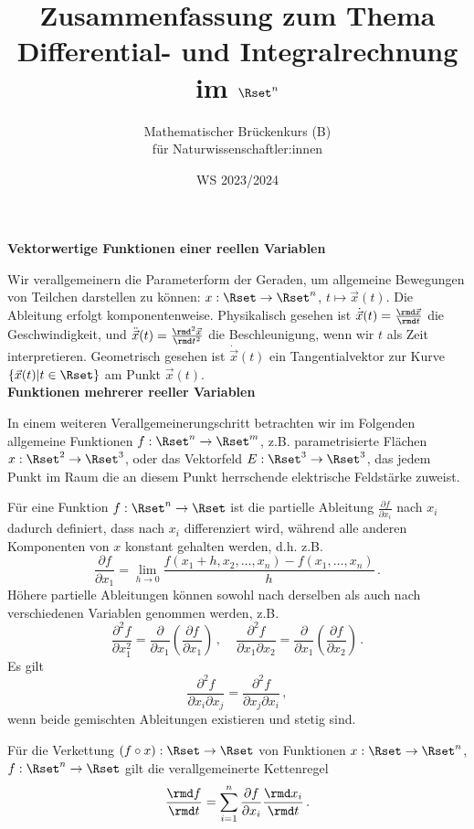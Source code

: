 \documentclass[a4paper,10pt]{article}
\title{Zusammenfassung zum Thema \\ Differential- und Integralrechnung im $\Rset^n$}
\author{Mathematischer Brückenkurs (B)\\für Naturwissenschaftler:innen}
\date{WS 2023/2024}
\begin{document}
\parindent0pt
\maketitle


{\bf Vektorwertige Funktionen einer reellen Variablen}

Wir verallgemeinern die Parameterform der Geraden, um allgemeine
Bewegungen von Teilchen darstellen zu können: $x:\Rset\to\Rset^n$,
$t\mapsto \vec{x}(t)$. Die Ableitung erfolgt komponentenweise.
Physikalisch gesehen ist $\dot{\vec{x}}(t) =\frac{\rmd \vec{x}}{\rmd t}$
die Geschwindigkeit, und $\ddot{\vec{x}}(t) =\frac{\rmd^2 \vec{x}}{\rmd t^2}$
die Beschleunigung, wenn wir $t$ als Zeit interpretieren.
Geometrisch gesehen ist $\dot{\vec{x}}(t)$ ein Tangentialvektor zur
Kurve $\{\vec{x}(t)|t\in\Rset\}$ am Punkt $\vec{x}(t)$.\\


{\bf Funktionen mehrerer reeller Variablen}

In einem weiteren Verallgemeinerungschritt betrachten wir im Folgenden
allgemeine Funktionen $f:\Rset^n\to\Rset^m$, z.B. 
parametrisierte Flächen $x:\Rset^2\to\Rset^3$, oder
das Vektorfeld $E:\Rset^3\to\Rset^3$, das jedem Punkt im Raum die
an diesem Punkt herrschende elektrische Feldstärke zuweist.

Für eine Funktion $f:\Rset^n\to\Rset$ ist die
partielle Ableitung $\frac{\partial f}{\partial x_i}$ nach $x_i$
dadurch definiert, dass nach $x_i$ differenziert wird, während alle
anderen Komponenten von $x$ konstant gehalten werden, d.h. z.B.
\[
\frac{\partial f}{\partial x_1} = \lim\limits_{h\to 0} \frac{f(x_1+h,x_2,\ldots,x_n)-f(x_1,\ldots,x_n)}{h}\,.
\]
Höhere partielle Ableitungen können sowohl nach derselben als auch nach verschiedenen Variablen genommen werden, z.B.
\[
\frac{\partial^2 f}{\partial x_1^2} = \frac{\partial}{\partial x_1}\left(\frac{\partial f}{\partial x_1}\right)\,,~~~~~
\frac{\partial^2 f}{\partial x_1\partial x_2} = \frac{\partial}{\partial x_1}\left(\frac{\partial f}{\partial x_2}\right)\,.
\]
Es gilt
\[
\frac{\partial^2 f}{\partial x_i\partial x_j} = \frac{\partial^2 f}{\partial x_j\partial x_i}\,,
\]
wenn beide gemischten Ableitungen existieren und stetig sind.

Für die Verkettung $(f\circ x):\Rset\to\Rset$ von Funktionen
$x:\Rset\to\Rset^n$, $f:\Rset^n\to\Rset$ gilt die verallgemeinerte
Kettenregel
\[
\frac{\rmd f}{\rmd t}=\sum_{i=1}^n \frac{\partial f}{\partial x_i}\frac{\rmd x_i}{\rmd t}\,.
\]
\end{document}
